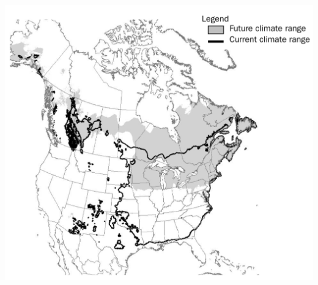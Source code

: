 \documentclass{eecslides}
\begin{document}

	\begin{frame}
		\begin{center}
			\includegraphics[height=0.65\textheight]{mckenney}
		\end{center}
	\end{frame}

\end{document}
